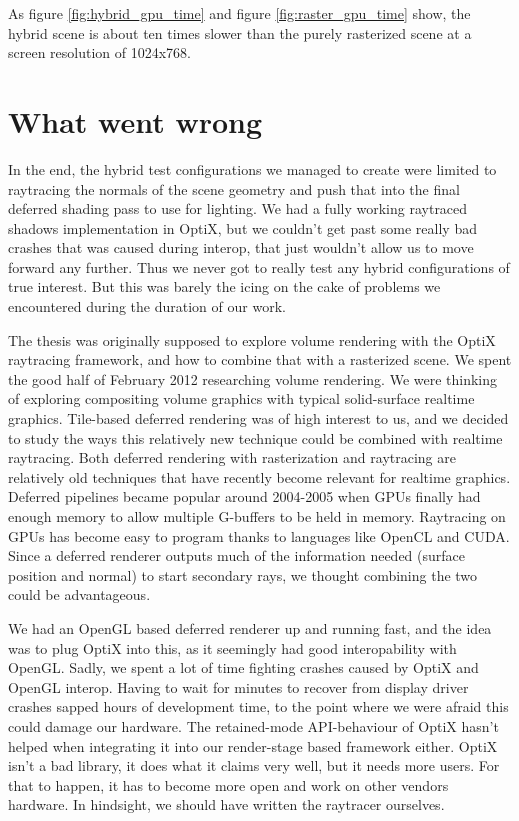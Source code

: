 As figure \ref{fig:hybrid_gpu_time} and figure \ref{fig:raster_gpu_time} show, the hybrid scene is about ten times slower than the purely rasterized scene at a screen resolution of 1024x768.

\section{What went wrong}
In the end, the hybrid test configurations we managed to create were limited to raytracing the normals of the scene geometry and push that into the final deferred shading pass to use for lighting. We had a fully working raytraced shadows implementation in OptiX, but we couldn't get past some really bad crashes that was caused during interop, that just wouldn't allow us to move forward any further. Thus we never got to really test any hybrid configurations of true interest. But this was barely the icing on the cake of problems we encountered during the duration of our work.

The thesis was originally supposed to explore volume rendering with the OptiX raytracing framework, and how to combine that with a rasterized scene. We spent the good half of February 2012 researching volume rendering. We were thinking of exploring compositing volume graphics with typical solid-surface realtime graphics. Tile-based deferred rendering was of high interest to us, and we decided to study the ways this relatively new technique could be combined with realtime raytracing. Both deferred rendering with rasterization and raytracing are relatively old techniques that have recently become relevant for realtime graphics. Deferred pipelines became popular around 2004-2005 when GPUs finally had enough memory to allow multiple G-buffers to be held in memory. Raytracing on GPUs has become easy to program thanks to languages like OpenCL and CUDA. Since a deferred renderer outputs much of the information needed (surface position and normal) to start secondary rays, we thought combining the two could be advantageous.

We had an OpenGL based deferred renderer up and running fast, and the idea was to plug OptiX into this, as it seemingly had good interopability with OpenGL. Sadly, we spent a lot of time fighting crashes caused by OptiX and OpenGL interop. Having to wait for minutes to recover from display driver crashes sapped hours of development time, to the point where we were afraid this could damage our hardware. The retained-mode API-behaviour of OptiX hasn't helped when integrating it into our render-stage based framework either. OptiX isn't a bad library, it does what it claims very well, but it needs more users. For that to happen, it has to become more open and work on other vendors hardware. In hindsight, we should have written the raytracer ourselves.

